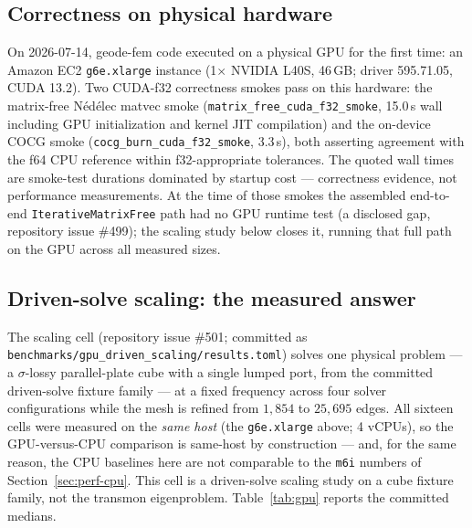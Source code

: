 \documentclass{anvil-paper}
\begin{document}
\subsection{Correctness on physical hardware}

On 2026-07-14, geode-fem code executed on a physical GPU for the first
time: an Amazon EC2 \texttt{g6e.xlarge} instance (1$\times$ NVIDIA L40S,
46\,GB; driver 595.71.05, CUDA 13.2). Two CUDA-f32 correctness smokes pass
on this hardware: the matrix-free N\'ed\'elec matvec smoke
(\texttt{matrix\_free\_cuda\_f32\_smoke}, 15.0\,s wall including GPU
initialization and kernel JIT compilation) and the on-device COCG smoke
(\texttt{cocg\_burn\_cuda\_f32\_smoke}, 3.3\,s), both asserting agreement
with the f64 CPU reference within f32-appropriate tolerances. The quoted
wall times are smoke-test durations dominated by startup cost ---
correctness evidence, not performance measurements. At the time of those
smokes the assembled end-to-end \texttt{IterativeMatrixFree} path had no
GPU runtime test (a disclosed gap, repository issue \#499); the scaling
study below closes it, running that full path on the GPU across all
measured sizes.

\subsection{Driven-solve scaling: the measured answer}

The scaling cell (repository issue \#501; committed as
\texttt{benchmarks/gpu\_driven\_scaling/results.toml}) solves one physical
problem --- a $\sigma$-lossy parallel-plate cube with a single lumped
port, from the committed driven-solve fixture family --- at a fixed
frequency across four solver configurations while the mesh is refined
from $1{,}854$ to $25{,}695$ edges. All sixteen cells were measured on the
\emph{same host} (the \texttt{g6e.xlarge} above; 4 vCPUs), so the
GPU-versus-CPU comparison is same-host by construction --- and, for the
same reason, the CPU baselines here are not comparable to the
\texttt{m6i} numbers of Section~\ref{sec:perf-cpu}. This cell is a
driven-solve scaling study on a cube fixture family, not the transmon
eigenproblem. Table~\ref{tab:gpu} reports the committed medians.
\end{document}
